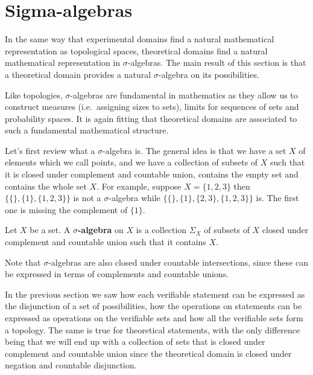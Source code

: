 	\section{Sigma-algebras}
	
	In the same way that experimental domains find a natural mathematical representation as topological spaces, theoretical domains find a natural mathematical representation in $\sigma$-algebras. The main result of this section is that a theoretical domain provides a natural $\sigma$-algebra on its possibilities.
	
	Like topologies, $\sigma$-algebras are fundamental in mathematics as they allow us to construct measures (i.e.~assigning sizes to sets), limits for sequences of sets and probability spaces. It is again fitting that theoretical domains are associated to such a fundamental mathematical structure.
	
	Let's first review what a $\sigma$-algebra is. The general idea is that we have a set $X$ of elements which we call points, and we have a collection of subsets of $X$ such that it is closed under complement and countable union, contains the empty set and contains the whole set $X$. For example, suppose $X = \{1,2,3\}$ then  $\{\{\},\{1\},\{1,2,3\}\}$ is not a $\sigma$-algebra while $\{\{\},\{1\}, \{2,3\},\{1,2,3\}\}$ is. The first one is missing the complement of $\{1\}$.
	
	\begin{mathSection}
		\begin{defn}
			Let $X$ be a set. A \textbf{$\sigma$-algebra} on $X$ is a collection $\Sigma_X$ of subsets of $X$ closed under complement and countable union such that it contains $X$.
		\end{defn}
	\end{mathSection}
	
	Note that $\sigma$-algebras are also closed under countable intersections, since these can be expressed in terms of complements and countable unions.
	
	In the previous section we saw how each verifiable statement can be expressed as the disjunction of a set of possibilities, how the operations on statements can be expressed as operations on the verifiable sets and how all the verifiable sets form a topology. The same is true for theoretical statements, with the only difference being that we will end up with a collection of sets that is closed under complement and countable union since the theoretical domain is closed under negation and countable disjunction.
	
